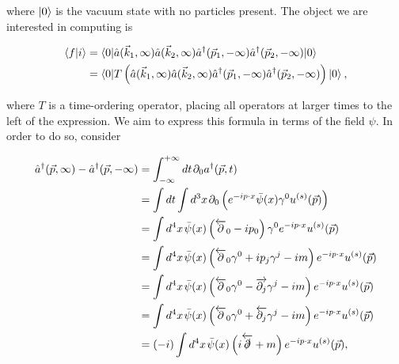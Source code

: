 where $\mathinner{\lvert0\rangle}_{\hspace{-0.1em}}$ is the vacuum state with no particles present. The object we are interested in computing is

\begin{equation}
\begin{split}
\left< f | i \right> &= \mathinner{\langle0\vert\hat{a}(\vec{k}_1,\infty) \hat{a}(\vec{k}_2 ,\infty) \hat{a}^\dagger(\vec{p}_1,-\infty) \hat{a}^\dagger(\vec{p}_2 ,-\infty)\vert0\rangle}_{} \\
& = \mathinner{\langle0\vert T \left(\hat{a}(\vec{k}_1,\infty) \hat{a}(\vec{k}_2 ,\infty) \hat{a}^\dagger(\vec{p}_1,-\infty) \hat{a}^\dagger(\vec{p}_2 ,-\infty) \right)\vert0\rangle}_{},
\end{split}
\end{equation}

where $T$ is a time-ordering operator, placing all operators at larger times to the left of the expression. We aim to express this formula in terms of the field $\psi$. In order to do so, consider

\begin{equation}
\begin{split}
\hat{a}^\dagger(\vec{p},\infty) - \hat{a}^\dagger(\vec{p},-\infty) &= \int_{- \infty}^{+ \infty} dt \hspace{1pt} \partial_0 a^\dagger(\vec{p},t) \\
&=  \int dt \int d^3 x \hspace{1pt} \partial_0 \left( e^{- i p \cdot x} \bar{\psi}(x) \gamma^0 u^{(s)}(\vec{p}) \right) \\
&= \int d^4 x \hspace{1pt} \bar{\psi}(x) \left(\overleftarrow{\partial}_0 - i p_0 \right) \gamma^0 e^{- i p \cdot x} u^{(s)}(\vec{p}) \\
&=  \int d^4 x \hspace{1pt} \bar{\psi}(x) \left(\overleftarrow{\partial}_0 \gamma^0 + i p_j \gamma^j - im \right) e^{- i p \cdot x} u^{(s)}(\vec{p}) \\
&=  \int d^4 x \hspace{1pt} \bar{\psi}(x) \left(\overleftarrow{\partial}_0 \gamma^0 - \overrightarrow{\partial_j} \gamma^j - im \right) e^{- i p \cdot x} u^{(s)}(\vec{p}) \\
&=  \int d^4 x \hspace{1pt} \bar{\psi}(x) \left(\overleftarrow{\partial}_0 \gamma^0 + \overleftarrow{\partial_j} \gamma^j - im \right) e^{- i p \cdot x} u^{(s)}(\vec{p}) \\
&=  (-i) \int d^4 x \hspace{1pt} \bar{\psi}(x) \left(i \overleftarrow{\slashed{\partial}} + m \right) e^{- i p \cdot x} u^{(s)}(\vec{p}),
\end{split}
\end{equation}

